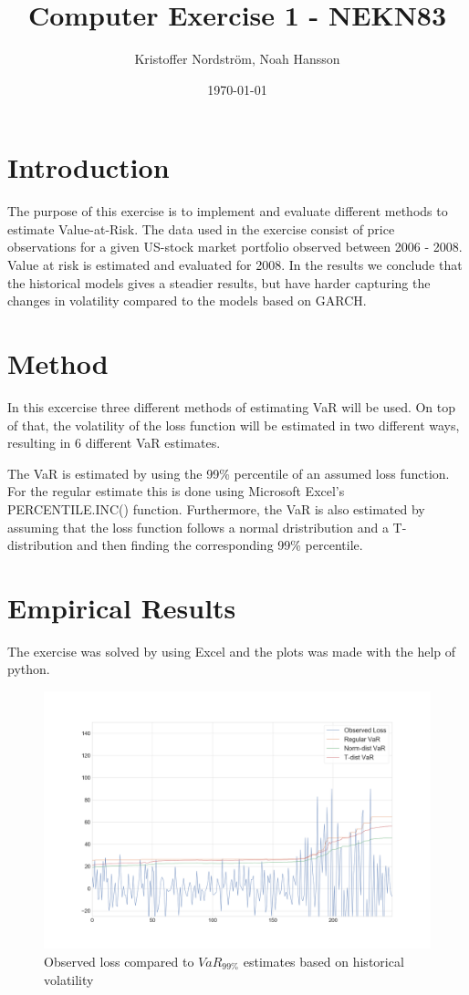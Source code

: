 \documentclass[a4paper]{article}
\title{Computer Exercise 1 - NEKN83}
\author{Kristoffer Nordström, Noah Hansson}
\date{\today}
\begin{document}
\maketitle

\section{Introduction}
The purpose of this exercise is to implement and evaluate different methods to estimate Value-at-Risk. The data used in the exercise consist of price observations for a given US-stock market portfolio observed between 2006 - 2008. Value at risk is estimated and evaluated for 2008. In the results we conclude that the historical models gives a steadier results, but have harder capturing the changes in volatility compared to the models based on GARCH.

\section{Method}
In this excercise three different methods of estimating VaR will be used. On top of that, the volatility of the loss function will be estimated in two different ways, resulting in 6 different VaR estimates.

The VaR is estimated by using the 99\% percentile of an assumed loss function. For the regular estimate this is done using Microsoft Excel's PERCENTILE.INC() function. Furthermore, the VaR is also estimated by assuming that the loss function follows a normal dristribution and a T-distribution and then finding the corresponding 99\% percentile.



\section{Empirical Results}
The exercise was solved by using Excel and the plots was made with the help of python.

\begin{figure}[htbp]
    \includegraphics[width=\textwidth]{VaR1.png}
    \caption{Observed loss compared to $VaR_{99\%}$ estimates based on historical volatility}
    \label{var1}
\end{figure}
\end{document}
